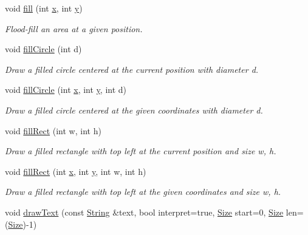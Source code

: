 \begin{DoxyCompactItemize}
void \hyperlink{classGUI_1_1Drawable_a87379f6a31eb6399616133d33d24cc11}{fill} (int \hyperlink{classGUI_1_1Drawable_a098294925bd310aa41080a2441790b80}{x}, int \hyperlink{classGUI_1_1Drawable_a574c99954cc268937f2c66ebe1332316}{y})
\begin{DoxyCompactList}\small\item\em Flood-\/fill an area at a given position. \end{DoxyCompactList}\item 
void \hyperlink{classGUI_1_1Drawable_a7c8bdd25268ee6b6fe28a8477d940273}{fill\-Circle} (int d)
\begin{DoxyCompactList}\small\item\em Draw a filled circle centered at the current position with diameter {\ttfamily d}. \end{DoxyCompactList}\item 
void \hyperlink{classGUI_1_1Drawable_aa6fbf7f2c20f1d7c5f37af4e5dc6e3f5}{fill\-Circle} (int \hyperlink{classGUI_1_1Drawable_a098294925bd310aa41080a2441790b80}{x}, int \hyperlink{classGUI_1_1Drawable_a574c99954cc268937f2c66ebe1332316}{y}, int d)
\begin{DoxyCompactList}\small\item\em Draw a filled circle centered at the given coordinates with diameter {\ttfamily d}. \end{DoxyCompactList}\item 
void \hyperlink{classGUI_1_1Drawable_af28c6abd372251f47f1c2748c2aea340}{fill\-Rect} (int w, int h)
\begin{DoxyCompactList}\small\item\em Draw a filled rectangle with top left at the current position and size {\ttfamily w}, {\ttfamily h}. \end{DoxyCompactList}\item 
void \hyperlink{classGUI_1_1Drawable_af31dc67b9230aa12a0988905643238c8}{fill\-Rect} (int \hyperlink{classGUI_1_1Drawable_a098294925bd310aa41080a2441790b80}{x}, int \hyperlink{classGUI_1_1Drawable_a574c99954cc268937f2c66ebe1332316}{y}, int w, int h)
\begin{DoxyCompactList}\small\item\em Draw a filled rectangle with top left at the given coordinates and size {\ttfamily w}, {\ttfamily h}. \end{DoxyCompactList}\item 
void \hyperlink{classGUI_1_1Drawable_ac88bcd93aad76b004ea2404fa0a37a69}{draw\-Text} (const \hyperlink{classGUI_1_1String}{String} \&text, bool interpret=true, \hyperlink{namespaceGUI_a10b6232e08729baa0bd211a86a69ce36}{Size} start=0, \hyperlink{namespaceGUI_a10b6232e08729baa0bd211a86a69ce36}{Size} len=(\hyperlink{namespaceGUI_a10b6232e08729baa0bd211a86a69ce36}{Size})-\/1)

\end{DoxyCompactItemize}
